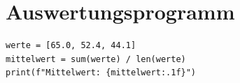 \documentclass{scrartcl}
\begin{document}
\section{Auswertungsprogramm}
\begin{lstlisting}[caption={Berechnung des Mittelwerts},label={lst:mittel}]
werte = [65.0, 52.4, 44.1]
mittelwert = sum(werte) / len(werte)
print(f"Mittelwert: {mittelwert:.1f}")
\end{lstlisting}
\end{document}
